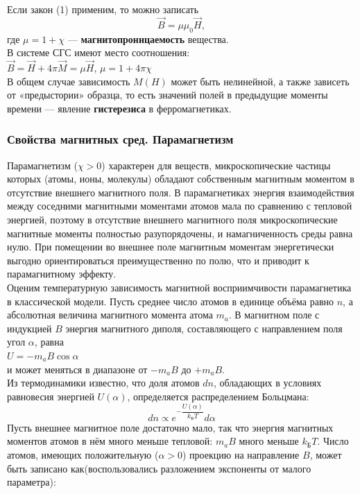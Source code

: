 \documentclass[a4paper]{article}
\begin{document}
Если закон (1) применим, то можно записать
\begin{equation}\label{2}
\vec{B} = \mu \mu_0 \vec{H},
\end{equation}
где $\mu = 1+\chi$ --- \textbf{магнитопроницаемость} вещества.\\
В системе СГС имеют место соотношения:\\
$\vec{B} = \vec{H}+4\pi \vec{M} = \mu \vec{H}$, $\mu  = 1+4\pi \chi$\\
 В общем случае зависимость $M(H)$ может быть нелинейной, а также зависеть от «предыстории» образца, то есть значений полей в предыдущие моменты времени — явление \textbf{гистерезиса} в ферромагнетиках.
	
	
	\subsubsection{Свойства магнитных сред. Парамагнетизм}
	Парамагнетизм ($\chi > 0$) характерен для веществ, микроскопические частицы которых (атомы, ионы, молекулы) обладают собственным магнитным моментом в отсутствие внешнего магнитного поля. В парамагнетиках энергия взаимодействия между соседними магнитными моментами атомов мала по сравнению с тепловой энергией, поэтому в отсутствие внешнего магнитного поля микроскопические магнитные моменты полностью разупорядочены, и намагниченность среды равна нулю. При помещении во внешнее поле магнитным моментам энергетически выгодно ориентироваться преимущественно по полю, что и приводит к парамагнитному эффекту.\\
Оценим температурную зависимость магнитной восприимчивости парамагнетика в классической модели. Пусть среднее число атомов в еди­нице объёма равно \textbf{$n$}, а абсолютная величина магнитного момента атома \textbf{$m_a$}. В магнитном поле с индукцией $B$ энергия магнитного диполя, составляющего с направлением поля угол $\alpha$, равна\\
$U = -\textbf{$m_a$}B \cos{\alpha}$\\
и может меняться в диапазоне от $-\textbf{$m_a$}B$ до $+\textbf{$m_a$}B$.\\
Из термодинамики известно, что доля атомов $dn$, обладающих в условиях равновесия энергией $U(\alpha)$, определяется распределением Больцмана:\\
\begin{equation}\label{}
dn  \propto e^{-\dfrac{U(\alpha)}{k_{\text{Б}}T}} d \alpha 
\end{equation}
Пусть внешнее магнитное поле достаточно мало, так что энергия магнитных моментов атомов в нём много меньше тепловой:  $m_aB$ много меньше $k_{\text{Б}}T$. Число атомов, имеющих положительную ($\alpha > 0$) проекцию на направление $B$, может быть записано как(воспользовались разложением экспоненты от малого параметра):\\
\end{document}
